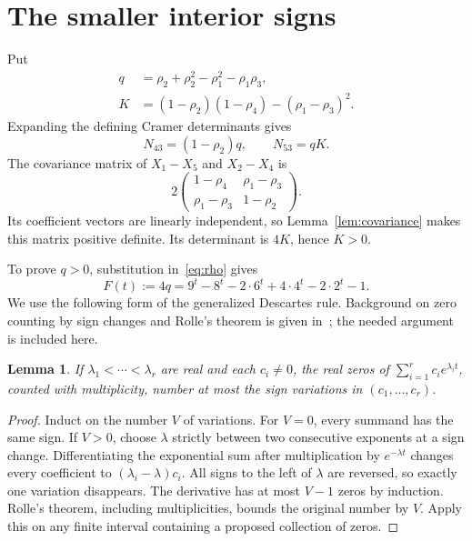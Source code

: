 \documentclass[11pt]{article}
\newtheorem{lemma}[theorem]{Lemma}
\begin{document}
\section{The smaller interior signs}

Put
\begin{equation}\label{eq:qK}
 \begin{split}
 q&=\rho_2+\rho_2^2-\rho_1^2-\rho_1\rho_3,\\
 K&=(1-\rho_2)(1-\rho_4)-(\rho_1-\rho_3)^2.
 \end{split}
\end{equation}
Expanding the defining Cramer determinants gives
\begin{equation}\label{eq:factorizations}
 N_{43}=(1-\rho_2)q,\qquad N_{53}=qK.
\end{equation}
The covariance matrix of $X_1-X_5$ and $X_2-X_4$ is
\[
 2\begin{pmatrix}
 1-\rho_4&\rho_1-\rho_3\\
 \rho_1-\rho_3&1-\rho_2
 \end{pmatrix}.
\]
Its coefficient vectors are linearly independent, so
Lemma~\ref{lem:covariance} makes this matrix positive definite.
Its determinant is $4K$, hence $K>0$.

To prove $q>0$, substitution in~\eqref{eq:rho} gives
\begin{equation}\label{eq:F}
 F(t):=4q=9^t-8^t-2\cdot6^t+4\cdot4^t-2\cdot2^t-1.
\end{equation}
We use the following form of the generalized Descartes rule. Background
on zero counting by sign changes and Rolle's theorem is given
in~\cite{Jameson2006}; the needed argument is included here.

\begin{lemma}\label{lem:zeros}
If $\lambda_1<\cdots<\lambda_r$ are real and each $c_i\ne0$, the real
zeros of $\sum_{i=1}^r c_i e^{\lambda_i t}$, counted with multiplicity,
number at most the sign variations in $(c_1,\ldots,c_r)$.
\end{lemma}

\begin{proof}
Induct on the number $V$ of variations. For $V=0$, every summand has
the same sign. If $V>0$, choose $\lambda$ strictly between two consecutive
exponents at a sign change. Differentiating the exponential sum after
multiplication by $e^{-\lambda t}$ changes every coefficient to
$(\lambda_i-\lambda)c_i$. All signs to the left of $\lambda$ are reversed,
so exactly one variation disappears. The derivative has at most $V-1$
zeros by induction. Rolle's theorem, including multiplicities, bounds the
original number by $V$. Apply this on any finite interval containing a
proposed collection of zeros.
\end{proof}
\end{document}
